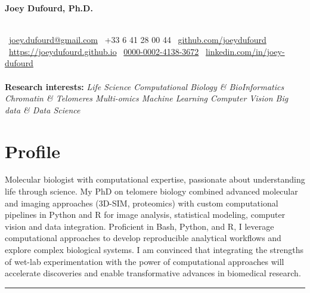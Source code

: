 \documentclass[11pt,a4paper]{article}
\newcommand{\sep}{\;\textbar\;}
\begin{document}
\newcommand{\PortfolioLink}{https://joeydufourd.github.io}
\noindent
\begin{center}
    \centering
    {\LARGE \textbf{Joey Dufourd, Ph.D.}}
    \end{center}
\begin{center}
\noindent{\color{sapin}\rule{0.4\textwidth}{0.6pt}}\\[8pt]
\vspace{2pt}
\faEnvelope~\href{mailto:joey.dufourd@gmail.com}{joey.dufourd@gmail.com} \sep \faPhone~+33 6 41 28 00 44 \sep
\faGithub~\href{https://github.com/joeydufourd}{github.com/joeydufourd} \sep \faGlobe~\href{https://joeydufourd.github.io/}{https://joeydufourd.github.io} \sep
\faOrcid~\href{https://orcid.org/0000-0002-4138-3672}{0000-0002-4138-3672} \sep
\faLinkedin~\href{https://linkedin.com/in/joey-dufourd}{linkedin.com/in/joey-dufourd}
\\[6pt]
\vspace{2pt}
\noindent{\color{sapin}\rule{0.8\textwidth}{0.6pt}}\\[8pt]
\vspace{2pt}
\textbf{Research interests:} \textit{Life Science \sep Computational Biology \& BioInformatics \sep Chromatin \& Telomeres \sep Multi-omics \sep Machine Learning \sep Computer Vision \sep Big data \& Data Science}
\end{center}
\vspace{1.5pt}
\noindent{\color{sapin}\rule{\textwidth}{0.6pt}}
\section*{Profile}
Molecular biologist with computational expertise, passionate about understanding life through science.
My PhD on telomere biology combined advanced molecular and imaging approaches (3D-SIM, proteomics) with custom computational pipelines in Python and R for image analysis, statistical modeling, computer vision and data integration.
Proficient in Bash, Python, and R, I leverage computational approaches to develop reproducible analytical workflows and explore complex biological systems.
I am convinced that integrating the strengths of wet-lab experimentation with the power of computational approaches will accelerate discoveries and enable transformative advances in biomedical research.\\
\noindent\textcolor{sapin}{\rule{\textwidth}{0.6pt}}
\end{document}
